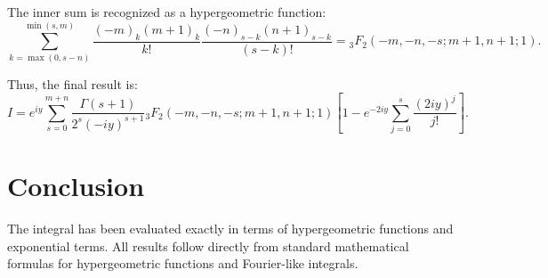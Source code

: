 \documentclass[12pt]{article}
\begin{document}
The inner sum is recognized as a hypergeometric function:
\[
\sum_{k=\max(0, s-n)}^{\min(s, m)} \frac{(-m)_k (m+1)_k}{k!} \frac{(-n)_{s-k} (n+1)_{s-k}}{(s-k)!} = 
{}_3F_2\left(-m, -n, -s; m+1, n+1; 1\right).
\]

Thus, the final result is:
\[
I = e^{i y} \sum_{s=0}^{m+n} \frac{\Gamma(s+1)}{2^s (-i y)^{s+1}} 
{}_3F_2\left(-m, -n, -s; m+1, n+1; 1\right) 
\left[ 1 - e^{-2 i y} \sum_{j=0}^s \frac{(2 i y)^j}{j!} \right].
\]

\section*{Conclusion}

The integral has been evaluated exactly in terms of hypergeometric functions and exponential terms. All results follow directly from standard mathematical formulas for hypergeometric functions and Fourier-like integrals.
\end{document}
